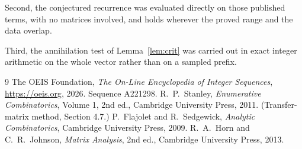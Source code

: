 \documentclass[11pt,a4paper]{article}
\theoremstyle{plain}
\theoremstyle{definition}
\begin{document}
Second, the conjectured recurrence was evaluated directly on those published terms, with no
matrices involved, and holds wherever the proved range and the data overlap.

Third, the annihilation test of Lemma~\ref{lem:crit} was carried out in exact integer
arithmetic on the whole vector rather than on a sampled prefix.

\begin{thebibliography}{9}
 The OEIS Foundation, \emph{The On-Line Encyclopedia of Integer
Sequences}, \url{https://oeis.org}, 2026. Sequence A221298.
 R.~P.~Stanley, \emph{Enumerative Combinatorics}, Volume 1, 2nd ed.,
Cambridge University Press, 2011. (Transfer-matrix method, Section 4.7.)
 P.~Flajolet and R.~Sedgewick, \emph{Analytic Combinatorics}, Cambridge
University Press, 2009.
 R.~A.~Horn and C.~R.~Johnson, \emph{Matrix Analysis}, 2nd ed., Cambridge
University Press, 2013.
\end{thebibliography}
\end{document}
